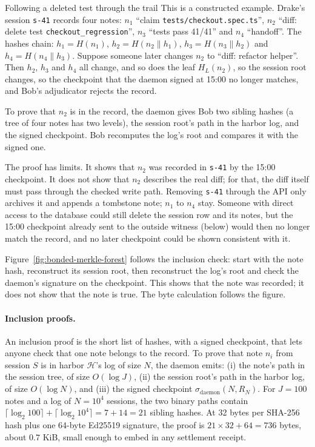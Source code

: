 \documentclass[11pt,a4paper]{article}
\theoremstyle{definition}
\theoremstyle{remark}
\begin{document}
\begin{pdexample}{Following a deleted test through the trail}
This is a constructed example. Drake's session \texttt{s-41} records four
notes: $n_1$ ``claim \texttt{tests/checkout.spec.ts}'', $n_2$ ``diff: delete
test \texttt{checkout\_regression}'', $n_3$ ``tests pass 41/41'' and $n_4$
``handoff''. The hashes chain: $h_1=H(n_1)$, $h_2=H(n_2 \| h_1)$,
$h_3=H(n_3 \| h_2)$ and $h_4=H(n_4 \| h_3)$. Suppose someone
later changes $n_2$ to ``diff: refactor helper''. Then $h_2$, $h_3$ and $h_4$
all change, and so does the leaf $H_L(n_2)$, so the session root changes, so
the checkpoint that the daemon signed at 15:00 no longer matches, and Bob's
adjudicator rejects the record.

To prove that $n_2$ is in the record, the daemon gives Bob two sibling hashes
(a tree of four notes has two levels), the session root's path in the harbor
log, and the signed checkpoint. Bob recomputes the log's root and compares it
with the signed one.

The proof has limits. It shows that $n_2$ was recorded in \texttt{s-41} by
the 15:00 checkpoint. It does not show that $n_2$ describes the real diff; for that, the
diff itself must pass through the checked write path. Removing \texttt{s-41}
through the API only archives it and appends a tombstone note; $n_1$ to $n_4$
stay. Someone with direct access to the database could still delete the
session row and its notes, but the 15:00 checkpoint already sent to the
outside witness (below) would then no longer match the record, and no later
checkpoint could be shown consistent with it.
\end{pdexample}

Figure~\ref{fig:bonded-merkle-forest} follows the inclusion check: start with
the note hash, reconstruct its session root, then reconstruct the log's root
and check the daemon's signature on the checkpoint. This shows that the note was recorded; it
does not show that the note is true. The byte calculation follows the figure.



\paragraph{Inclusion proofs.} An inclusion proof is the short list of hashes, with a signed checkpoint, that lets anyone check that one note belongs to the record. To prove that note $n_i$ from session $S$ is in harbor $\mathcal{H}$'s log of size $N$, the daemon emits: (i) the note's path in the session tree, of size $O(\log J)$, (ii) the session root's path in the harbor log, of size $O(\log N)$, and (iii) the signed checkpoint $\sigma_{\text{daemon}}(N,R_N)$. For $J=100$ notes and a log of $N=10^{4}$ sessions, the two binary paths contain $\lceil\log_2 100\rceil+\lceil\log_2 10^4\rceil=7+14=21$ sibling hashes. At 32 bytes per SHA-256 hash plus one 64-byte Ed25519 signature, the proof is $21\times32+64=736$ bytes, about $0.7$ KiB, small enough to embed in any settlement receipt.
\end{document}
